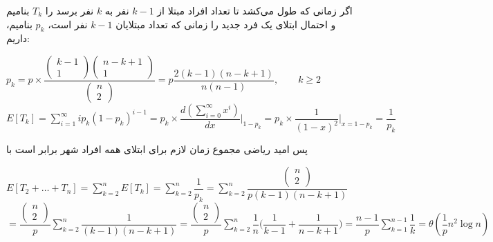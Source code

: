 \documentclass{scribe-cgenomics}
\begin{document}
\begin{حل}

اگر زمانی که طول می‌کشد تا تعداد افراد مبتلا از
$k-1$
نفر به
$k$
نفر برسد را
$T_k$
بنامیم و احتمال ابتلای یک فرد جدید را زمانی که تعداد مبتلایان
$k-1$
نفر است،
$p_k$
بنامیم،  داریم:

\begin{center}
$
p_k = p\times \dfrac{
\begin{pmatrix}
k-1 \\ 1
\end{pmatrix}
\begin{pmatrix}
n-k+1 \\ 1
\end{pmatrix}
}{
\begin{pmatrix}
n \\ 2
\end{pmatrix}
} 
= p\dfrac{2(k-1)(n-k+1)}{n(n-1)}, \qquad k\geq 2
$
\bigbreak
$
E[T_k] = \sum_{i=1}^{\infty} i p_k(1-p_k)^{i-1}
= p_k \times \dfrac{d (\sum_{i=0}^{\infty}x^i)}{d x}\Big|_{1-p_k}
= p_k \times \dfrac{1}{(1-x)^2}\Big|_{x=1-p_k}
= \dfrac{1}{p_k}
$
\end{center}

پس امید ریاضی مجموع زمان لازم برای ابتلای همه افراد شهر برابر است با

\begin{center}
$
E[T_2 + \dots + T_n] = \sum_{k=2}^{n}  E[T_k] = \sum_{k=2}^{n} \dfrac{1}{p_k} = \sum_{k=2}^{n} \dfrac{\begin{pmatrix}
n\\ 2
\end{pmatrix}}{
p (k-1) (n-k+1)
}
$
\bigbreak
$
= \dfrac{\begin{pmatrix}
n\\2
\end{pmatrix}
}{p} \sum_{k=2}^{n}\dfrac{1}{(k-1)(n-k+1)}
= \dfrac{\begin{pmatrix}
n\\2
\end{pmatrix}
}{p} \sum_{k=2}^{n}\dfrac{1}{n} \Big( \dfrac{1}{k-1} + \dfrac{1}{n-k+1}\Big)
= \dfrac{n-1}{p} \sum_{k=1}^{n-1} \dfrac{1}{k}
= \theta (\dfrac{1}{p} n^2 \log n)
$
\end{center}


\end{حل}

\newpage
\begin{prob}
\end{prob}
\end{document}

